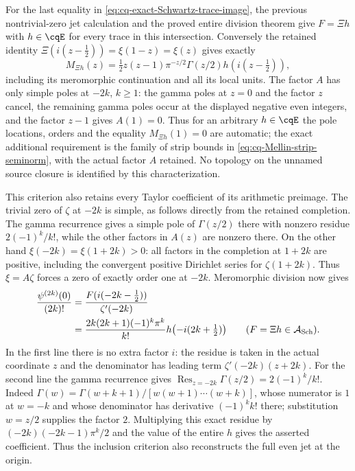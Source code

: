 For the last equality in
\eqref{eq:cq-exact-Schwartz-trace-image}, the previous
nontrivial-zero jet calculation and the proved entire division
theorem give $F=\Xi h$ with $h\in\cqE$ for every trace in
this intersection. Conversely the retained identity
$\Xi(i(z-\tfrac12))=\xi(1-z)=\xi(z)$ gives exactly
\[
 M_{\Xi h}(z)=
      \tfrac12z(z-1)\pi^{-z/2}\Gamma(z/2)
                      h(i(z-\tfrac12)),
\]
including its meromorphic continuation and all its local units.
The factor $A$ has only simple poles at $-2k$, $k\geq1$:
the gamma poles at $z=0$ and the factor $z$ cancel, the
remaining gamma poles occur at the displayed negative even
integers, and the factor $z-1$ gives $A(1)=0$.
Thus for an arbitrary $h\in\cqE$ the pole locations,
orders and the equality $M_{\Xi h}(1)=0$ are automatic;
the exact additional requirement is the family of strip bounds
in \eqref{eq:cq-Mellin-strip-seminorm}, with the actual factor
$A$ retained. No topology on the unnamed source closure is
identified by this characterization.

This criterion also retains every Taylor coefficient of its
arithmetic preimage. The trivial zero of $\zeta$ at $-2k$ is
simple, as follows directly from the retained completion.
The gamma recurrence gives a simple pole of $\Gamma(z/2)$
there with nonzero residue $2(-1)^k/k!$, while the other factors
in $A(z)$ are nonzero there. On the other hand
$\xi(-2k)=\xi(1+2k)>0$: all factors in the completion at $1+2k$
are positive, including the convergent positive Dirichlet series
for $\zeta(1+2k)$. Thus $\xi=A\zeta$ forces a zero of exactly
order one at $-2k$. Meromorphic division now gives
\begin{equation}\label{eq:cq-Schwartz-arithmetic-Taylor-data}
 \begin{aligned}
 \frac{\psi^{(2k)}(0)}{(2k)!}
 &=\frac{F(i(-2k-\tfrac12))}{\zeta'(-2k)}\\
 &=\frac{2k(2k+1)(-1)^k\pi^k}{k!}
                     h\bigl(-i(2k+\tfrac12)\bigr)
 \qquad(F=\Xi h\in\mathcal A_{\rm Sch}).
 \end{aligned}
\end{equation}
In the first line there is no extra factor $i$: the residue is
taken in the actual coordinate $z$ and the denominator has leading
term $\zeta'(-2k)(z+2k)$. For the second line the gamma
recurrence gives
$\operatorname*{Res}_{z=-2k}\Gamma(z/2)=2(-1)^k/k!$.
Indeed $\Gamma(w)=\Gamma(w+k+1)/
[w(w+1)\cdots(w+k)]$, whose numerator is $1$ at $w=-k$
and whose denominator has derivative $(-1)^kk!$ there;
substitution $w=z/2$ supplies the factor $2$. Multiplying
this exact residue by
$(-2k)(-2k-1)\pi^k/2$ and the value of the entire $h$
gives the asserted coefficient. Thus the inclusion criterion
also reconstructs the full even jet at the origin.

